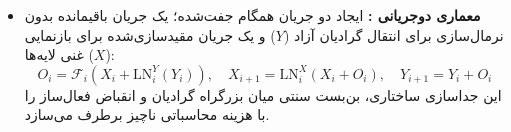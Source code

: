 \begin{itemize}
    \begin{equation}
        x_{l+1} = \text{LN}\left( \alpha x_l + \mathcal{F}_l(\text{LN}(x_l)) \right)
    \end{equation}
    با انتخاب $\alpha = L$ (کل عمق شبکه)، حاصل‌ضرب فاکتورهای انقباضی ژاکوبی در حد بی‌نهایت به عدد ۱ همگرا می‌شود:
    \begin{equation}
        \lim_{L \to \infty} \left( \frac{\alpha}{\sqrt{\alpha^2 + 1}} \right)^L = \lim_{L \to \infty} \left( 1 + \frac{1}{L^2} \right)^{-L/2} = 1
    \end{equation}
    این معادله انقراض گرادیان در Post-LN را خنثی ساخته و آموزش موفق شبکه‌هایی با عمق ۱۰۲۴ لایه را محقق نمود.
    \item \textbf{معماری دوجریانی  \cite{li2026siamesenorm}:} ایجاد دو جریان همگام جفت‌شده؛ یک جریان باقیمانده بدون نرمال‌سازی برای انتقال گرادیان آزاد ($Y$) و یک جریان مقیدسازی‌شده برای بازنمایی غنی لایه‌ها ($X$):
    \begin{equation}
        O_i = \mathcal{F}_i(X_i + \text{LN}_i^Y(Y_i)), \quad X_{i+1} = \text{LN}_i^X(X_i + O_i), \quad Y_{i+1} = Y_i + O_i
    \end{equation}
    این جداسازی ساختاری، بن‌بست سنتی میان بزرگراه گرادیان و انقباض فعال‌ساز را با هزینه محاسباتی ناچیز برطرف می‌سازد.
\end{itemize}

